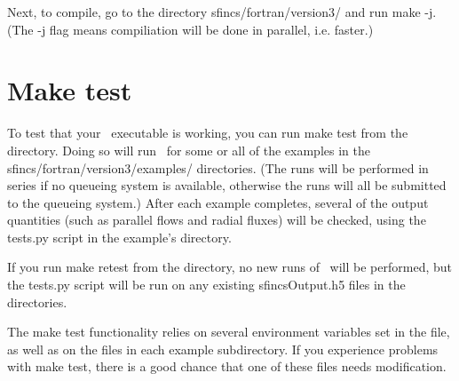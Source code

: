 Next, to compile, go to the directory {\ttfamily sfincs/fortran/version3/} and run {\ttfamily make -j}.
(The {\ttfamily -j} flag means compiliation will be done in parallel, i.e. faster.)

\section{Make test}
\label{sec:maketest}

To test that your \sfincs~executable is working, you can run {\ttfamily make test}
from the  directory.  Doing so will run
\sfincs~for some or all of the examples in the {\ttfamily sfincs/fortran/version3/examples/} directories.
(The runs will be performed in series if no queueing system is available, otherwise the runs will all
be submitted to the queueing system.)
After each example completes, several of the output quantities (such as parallel flows and radial fluxes)
will be checked, using the
{\ttfamily tests.py} script in the example's directory.

If you run {\ttfamily make retest} from the  directory,
no new runs of \sfincs~will be performed, but the {\ttfamily tests.py} script
will be run on any existing {\ttfamily sfincsOutput.h5} files in the  directories.

The {\ttfamily make test} functionality relies on several environment variables set in the
 file, as well as on the
 files in each example subdirectory.  If you experience
problems with  {\ttfamily make test}, there is a good chance that one of these files needs modification.
